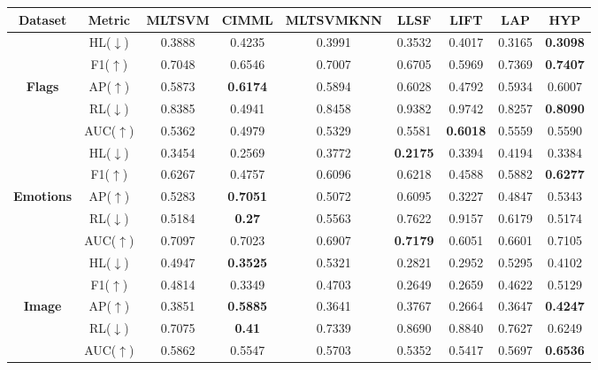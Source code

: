 \documentclass[12pt,a4paper,oneside,english]{report}
\begin{document}
\begin{table}
\fontsize{6pt}{7pt}\selectfont
\label{hmll1}
    \centering
    \begin{tabular}{|c|c|c|c|c|c|c|c|c|}
    \hline
        \textbf{Dataset} & \textbf{Metric} & \textbf{MLTSVM} & \textbf{CIMML} & \textbf{MLTSVMKNN} & \textbf{LLSF} & \textbf{LIFT}& \textbf{LAP} & \textbf{HYP}\\ \hline
        ~ & HL($\downarrow$)  & 0.3888 & 0.4235  & 0.3991 & 0.3532 & 0.4017 & 0.3165 & \textbf{0.3098} \\
        ~ & F1($\uparrow$) & 0.7048 & 0.6546 & 0.7007 & 0.6705 & 0.5969 & 0.7369 & \textbf{0.7407} \\
        \textbf{Flags} & AP($\uparrow$) & 0.5873 & \textbf{0.6174} & 0.5894 & 0.6028 & 0.4792 & 0.5934 & 0.6007 \\
        ~ & RL($\downarrow$)  & 0.8385 & 0.4941 & 0.8458 & 0.9382 & 0.9742 & 0.8257 & \textbf{0.8090} \\
        ~ & AUC($\uparrow$) & 0.5362 & 0.4979 & 0.5329 & 0.5581 & \textbf{0.6018} &  0.5559 & 0.5590 \\ \hline
        ~ & HL($\downarrow$)  & 0.3454 & 0.2569 & 0.3772 & \textbf{0.2175} & 0.3394 & 0.4194 & 0.3384 \\
        ~ & F1($\uparrow$) & 0.6267 & 0.4757& 0.6096 & 0.6218 & 0.4588 & 0.5882 & \textbf{0.6277} \\
        \textbf{Emotions} & AP($\uparrow$) &  0.5283 & \textbf{0.7051} & 0.5072 & 0.6095 & 0.3227 & 0.4847 & 0.5343 \\
        ~ & RL($\downarrow$)  & 0.5184 & \textbf{0.27} & 0.5563 & 0.7622 & 0.9157 & 0.6179 & 0.5174 \\
        ~ & AUC($\uparrow$) & 0.7097 & 0.7023 & 0.6907 & \textbf{0.7179} & 0.6051 & 0.6601 & 0.7105 \\ \hline
        ~ & HL($\downarrow$)  & 0.4947 & \textbf{0.3525} & 0.5321 & 0.2821 & 0.2952 & 0.5295 & 0.4102 \\
        ~ & F1($\uparrow$) & 0.4814 & 0.3349 & 0.4703 & 0.2649 & 0.2659 & 0.4622 & 0.5129 \\
        \textbf{Image} & AP($\uparrow$) & 0.3851 & \textbf{0.5885} &0.3641 & 0.3767 & 0.2664 & 0.3647 & \textbf{0.4247} \\
        ~ & RL($\downarrow$)  & 0.7075 & \textbf{0.41} & 0.7339 & 0.8690 & 0.8840 & 0.7627 & 0.6249 \\
        ~ & AUC($\uparrow$) & 0.5862 & 0.5547 & 0.5703 & 0.5352 & 0.5417 & 0.5697 & \textbf{0.6536} \\\hline

\end{tabular}
\end{table}
\end{document}

